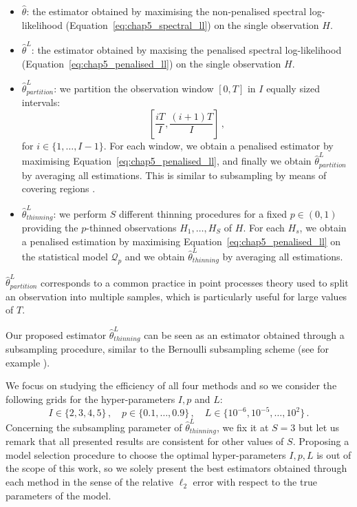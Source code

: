     \begin{itemize}
        \item $\hat \theta$: the estimator obtained by maximising the non-penalised spectral log-likelihood (Equation~\eqref{eq:chap5_spectral_ll}) on the single observation $H$.
        \item $\hat \theta^L$: the estimator obtained by maxising the penalised spectral log-likelihood (Equation~\eqref{eq:chap5_penalised_ll}) on the single observation $H$.
        \item $\hat \theta^L_{partition}$: we partition the observation window $[0,T]$ in $I$ equally sized intervals: \[\left[\frac{iT}{I}, \frac{(i+1)T}{I}\right]\,,\] for $i\in\{1,\ldots, I-1\}$. For each window, we obtain a penalised estimator by maximising Equation~\eqref{eq:chap5_penalised_ll}, and finally we obtain $\hat \theta^L_{partition}$ by averaging all estimations. This is similar to subsampling by means of covering regions \parencite{Possolo1991, Politis1999, Guan2007}.
        \item $\hat \theta^L_{thinning}$: we perform $S$ different thinning procedures for a fixed $p\in(0,1)$ providing the $p$-thinned observations $H_1, \ldots, H_S$ of $H$. For each $H_s$, we obtain a penalised estimation by maximising Equation~\eqref{eq:chap5_penalised_ll} on the statistical model $\mathcal{Q}_p$ and we obtain $\hat \theta^L_{thinning}$ by averaging all estimations.
    \end{itemize}

    $\hat \theta^L_{partition}$ corresponds to a common practice in point processes theory used to split an observation into multiple samples, which is particularly useful for large values of $T$.

    Our proposed estimator $\hat \theta^L_{thinning}$ can be seen as an estimator obtained through a subsampling procedure, similar to the Bernoulli subsampling scheme (see for example \textcite[Chapter 3.2]{Sarndal2003}). 
    
    We focus on studying the efficiency of all four methods and so we consider the following grids for the hyper-parameters $I, p$ and $L$:
    \[I\in\{2,3,4,5\}\,,\quad p\in\{0.1, \ldots, 0.9\}\,,\quad L\in\{10^{-6}, 10^{-5}, \ldots, 10^2\}\,.\]
    Concerning the subsampling parameter of $\hat \theta^L_{thinning}$, we fix it at $S=3$ but let us remark that all presented results are consistent for other values of $S$.
    Proposing a model selection procedure to choose the optimal hyper-parameters $I, p, L$ is out of the scope of this work, 
    so we solely present the best estimators obtained through each method in the sense of the relative $\ell_2$ error with respect to the true parameters of the model.

